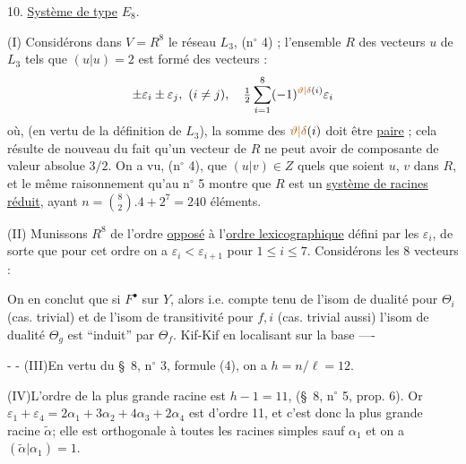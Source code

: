 10. \uline{Système de type} $E_8$.

(I) Considérons dans $V=R^8$ le réseau $L_3$, (n$^\circ$ 4) ; l'ensemble $R$ des vecteurs $u$ de $L_3$ tels que $(u|u)=2$ est formé des vecteurs :
\[
\pm\varepsilon_i\pm\varepsilon_j,\ (i\ne j),\quad
\tfrac12\sum_{i=1}^{8}(-1)^{\unsure{\vartheta|\delta}(i)}\varepsilon_i
\]
où, (en vertu de la définition de $L_3$), la somme des $\unsure{\vartheta|\delta}(i)$ doit être \uline{paire} ; cela résulte de nouveau du fait qu'un vecteur de $R$ ne peut avoir de composante de valeur absolue $3/2$. On a vu, (n$^\circ$ 4), que $(u|v)\in Z$ quels que soient $u$, $v$ dans $R$, et le même raisonnement qu'au n$^\circ$ 5 montre que $R$ est un \uline{système de racines réduit}, ayant $n=\binom82.4+2^7=240$ éléments.

(II) Munissons $R^8$ de l'ordre \uline{opposé} à l'\uline{ordre lexicographique} défini par les $\varepsilon_i$, de sorte que pour cet ordre on a $\varepsilon_i<\varepsilon_{i+1}$ pour $1\leq i\leq7$. Considérons les $8$ vecteurs :

On en conclut que si $F^\bullet$ 
 sur
$Y$, alors 
i.e. compte tenu de l'isom de dualité
pour $\Theta_i$ (cas. trivial) et de l'isom
de transitivité pour $f,i$ (cas. trivial aussi)
l'isom de dualité $\Theta_g$ est ``induit''
par $\Theta_f$. Kif-Kif en localisant
sur la base ----

-  -
(III)\quad En vertu du \S~8, n$^\circ$ 3, formule (4), on a $h=n/\ell=12$.

(IV)\quad L'ordre de la plus grande racine est $h-1=11$, (\S~8, n$^\circ$ 5, prop. 6).
Or $\varepsilon_1+\varepsilon_4=2\alpha_1+3\alpha_2+4\alpha_3+2\alpha_4$ est d'ordre 11, et c'est donc la plus grande
racine $\widetilde{\alpha}$; elle est orthogonale à toutes les racines simples sauf $\alpha_1$ et on a
$(\widetilde{\alpha}|\alpha_1)=1$.

